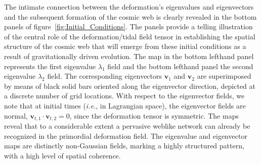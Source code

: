 \documentclass[a4paper, 11pt]{article}
\begin{document}
The intimate connection between the deformation's eigenvalues and eigenvectors and the subsequent formation of the cosmic web is clearly revealed in the bottom panels of figure~\ref{fig:Initial_Conditions}. The panels provide a telling illustration of the central role of the deformation/tidal field tensor in establishing the spatial structure of the cosmic web that will emerge from these initial conditions as a result of gravitationally driven evolution. The map in the bottom lefthand panel represents the first eigenvalue $\lambda_1$ field and the bottom lefthand panel the second eigenvalue $\lambda_2$ field. The corresponding eigenvectors $\bm{v}_1$ and $\bm{v}_2$ are superimposed by means of black solid bars oriented along the eigenvector direction, depicted at a discrete number of grid locations. With respect to the eigenvector fields, we note that at initial times (\textit{i.e.}, in Lagrangian space), the eigenvector fields are normal, $\bm{v}_{t,1}\cdot \bm{v}_{t,2}=0$, since the deformation tensor is symmetric. The maps reveal that to a considerable extent a pervasive weblike network can already be recognized in the primordial deformation field. The eigenvalue and eigenvector maps are distinctly non-Gaussian fields, marking a highly structured pattern, with a high level of spatial coherence.
\end{document}
